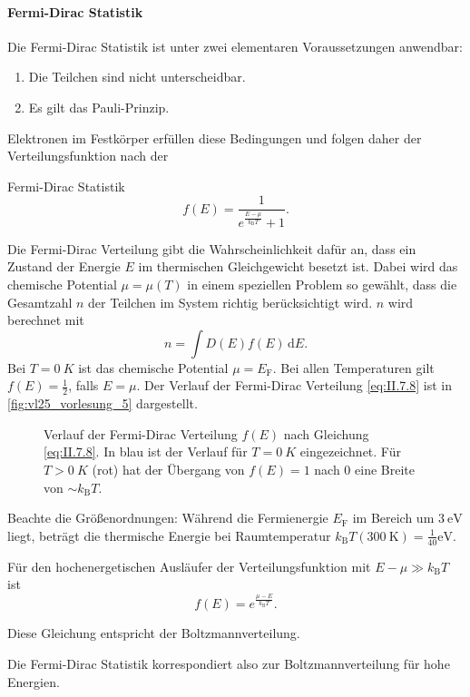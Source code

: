 \paragraph{Fermi-Dirac Statistik} 
	Die Fermi-Dirac Statistik ist unter zwei elementaren Voraussetzungen anwendbar:
	\begin{enumerate}[label=\roman*)]
		\item Die Teilchen sind nicht unterscheidbar.
		\item Es gilt das Pauli-Prinzip.
	\end{enumerate}
	Elektronen im Festkörper erfüllen diese Bedingungen und folgen daher der Verteilungsfunktion nach der
	\begin{important}
		Fermi-Dirac Statistik
		\begin{equation}
			\label{eq:II.7.8}
			f(E) = \frac{1}{e^{ \frac{E-\mu}{k_{\mathrm{B}}T}} +1}.
		\end{equation}
	\end{important}
	Die Fermi-Dirac Verteilung gibt die Wahrscheinlichkeit dafür an, dass ein Zustand der Energie $E$ im thermischen Gleichgewicht besetzt ist. 
	Dabei wird das chemische Potential $\mu=\mu(T)$ in einem speziellen Problem so gewählt, dass die Gesamtzahl $n$ der Teilchen im System richtig berücksichtigt wird.
	$n$ wird berechnet mit
	$$
	n = \int D(E) f(E) \,\mathrm{d} E.
	$$
	Bei $T=\SI{0}{K}$ ist das chemische Potential $\mu=E_\mathrm F$. Bei allen Temperaturen gilt $f(E)=\frac12$, falls $E=\mu$.
	Der Verlauf der Fermi-Dirac Verteilung \eqref{eq:II.7.8} ist in \autoref{fig:vl25_vorlesung_5} dargestellt.
	\begin{figure}[H]
		\centering
		\caption{Verlauf der Fermi-Dirac Verteilung $f(E)$ nach Gleichung \eqref{eq:II.7.8}. In blau ist der Verlauf für $T=\SI{0}{K}$ eingezeichnet. Für $T>\SI{0}{K}$ (rot) hat der Übergang von $f(E)=1$ nach 0 eine Breite von $\sim k_\mathrm B T$.}
		\label{fig:vl25_vorlesung_5}
	\end{figure}

	Beachte die Größenordnungen: Während die Fermienergie $E_{\mathrm{F}}$ im Bereich um $\SI{3}{\electronvolt}$ liegt, beträgt die thermische Energie bei Raumtemperatur $k_{\mathrm{B}}T (\SI{300}{\kelvin}) = \frac{1}{40}\si{ \electronvolt}$.

	Für den hochenergetischen Ausläufer der Verteilungsfunktion mit $E-\mu \gg k_{\mathrm{B}} T$ ist
	\begin{equation}
		\label{eq:II.7.9}
		f(E) = e^{ \frac{\mu - E}{k_{\mathrm{B}}T}}.
	\end{equation}
	\begin{verbal}
		Diese Gleichung entspricht der Boltzmannverteilung.
	\end{verbal}
	Die Fermi-Dirac Statistik korrespondiert also zur Boltzmannverteilung für hohe Energien.

